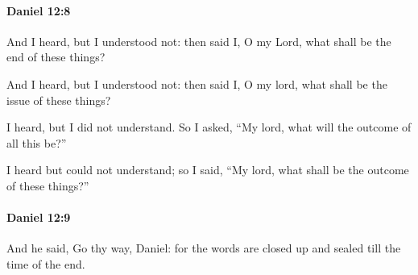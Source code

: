 		\paragraph{Daniel 12:8} %
			\label{DANIEL-12-8}

			And I heard, but I understood not: then said I, O my Lord, what shall be the end of these things?

			\begin{versebox}
					\item[BHS] 
					\item[LXX] 
					\item[ASV] And I heard, but I understood not: then said I, O my lord, what shall be the issue of these things?
					\item[NIV] I heard, but I did not understand. So I asked, “My lord, what will the outcome of all this be?”
					\item[NRSV] I heard but could not understand; so I said, “My lord, what shall be the outcome of these things?”
			\end{versebox}

		\paragraph{Daniel 12:9} %
			\label{DANIEL-12-9}

			And he said, Go thy way, Daniel: for the words are closed up and sealed till the time of the end.

